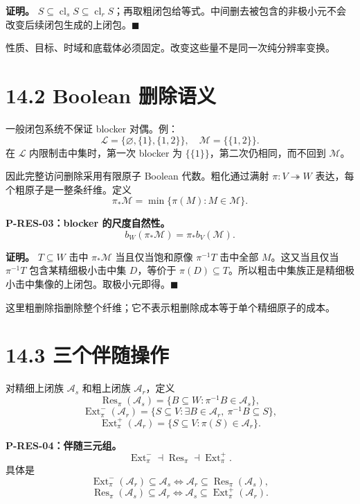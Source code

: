 \documentclass[
  11pt,
  oneside]{book}
\begin{document}
\textbf{证明。} \(S\subseteq\operatorname{cl}_sS\subseteq\operatorname{cl}_rS\)；再取粗闭包给等式。中间删去被包含的非极小元不会改变后续闭包生成的上闭包。\(\blacksquare\)

性质、目标、时域和底载体必须固定。改变这些量不是同一次纯分辨率变换。

\section{14.2 Boolean 删除语义}\label{boolean-ux5220ux9664ux8bedux4e49}

一般闭包系统不保证 blocker 对偶。例： \[\mathcal L=\{\varnothing,\{1\},\{1,2\}\},\quad
\mathcal M=\{\{1,2\}\}.\] 在 \(\mathcal L\) 内限制击中集时，第一次 blocker 为 \(\{\{1\}\}\)，第二次仍相同，而不回到 \(\mathcal M\)。

因此完整访问删除采用有限原子 Boolean 代数。粗化通过满射 \(\pi:V\twoheadrightarrow W\) 表达，每个粗原子是一整条纤维。定义 \[\pi_*\mathcal M=\min\{\pi(M):M\in\mathcal M\}.\]

\hypertarget{p-res-03}{}\label{p-res-03}

\textbf{P-RES-03：blocker 的尺度自然性。} \[b_W(\pi_*\mathcal M)=\pi_*b_V(\mathcal M).\]

\textbf{证明。} \(T\subseteq W\) 击中 \(\pi_*\mathcal M\) 当且仅当饱和原像 \(\pi^{-1}T\) 击中全部 \(M\)。这又当且仅当 \(\pi^{-1}T\) 包含某精细极小击中集 \(D\)，等价于 \(\pi(D)\subseteq T\)。所以粗击中集族正是精细极小击中集像的上闭包。取极小元即得。\(\blacksquare\)

这里粗删除指删除整个纤维；它不表示粗删除成本等于单个精细原子的成本。

\section{14.3 三个伴随操作}\label{ux4e09ux4e2aux4f34ux968fux64cdux4f5c}

对精细上闭族 \(\mathcal A_s\) 和粗上闭族 \(\mathcal A_r\)，定义 \[\operatorname{Res}_\pi(\mathcal A_s)
=\{B\subseteq W:\pi^{-1}B\in\mathcal A_s\},\] \[\operatorname{Ext}_\pi^-(\mathcal A_r)
=\{S\subseteq V:\exists B\in\mathcal A_r,\ \pi^{-1}B\subseteq S\},\] \[\operatorname{Ext}_\pi^+(\mathcal A_r)
=\{S\subseteq V:\pi(S)\in\mathcal A_r\}.\]

\hypertarget{p-res-04}{}\label{p-res-04}

\textbf{P-RES-04：伴随三元组。} \[\operatorname{Ext}^-_\pi\dashv\operatorname{Res}_\pi
\dashv\operatorname{Ext}^+_\pi.\] 具体是 \[\operatorname{Ext}^-_\pi(\mathcal A_r)\subseteq\mathcal A_s
\iff\mathcal A_r\subseteq\operatorname{Res}_\pi(\mathcal A_s),\] \[\operatorname{Res}_\pi(\mathcal A_s)\subseteq\mathcal A_r
\iff\mathcal A_s\subseteq\operatorname{Ext}^+_\pi(\mathcal A_r).\]
\end{document}
